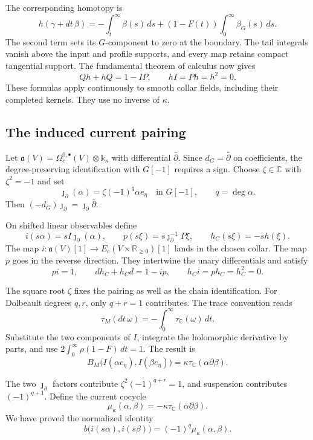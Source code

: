 The corresponding homotopy is
\[
 h(\gamma+dt\,\beta)=-\int_t^\infty\beta(s)\,ds
       +(1-F(t))\int_0^\infty\beta_G(s)\,ds.
\]
The second term sets its \(G\)-component to zero at the boundary.
The tail integrals vanish above the input and profile supports,
and every map retains compact tangential support.
The fundamental theorem of calculus now gives
\[
 Qh+hQ=1-IP,
 \qquad hI=Ph=h^2=0.
\]
These formulas apply continuously to smooth collar fields, including
their completed kernels. They use no inverse of \(\kappa\).

\subsection{The induced current pairing}

Let\label{pcsm:def:current-identification} \(\mathfrak a(V)=\Omega_c^{0,\bullet}(V)\otimes\mathbb k_\kappa\)
with differential \(\bar\partial\).
Since \(d_G=\bar\partial\) on coefficients, the degree-preserving
identification with \(G[-1]\) requires a sign.
Choose \(\zeta\in\mathbb C\) with \(\zeta^2=-1\) and set
\[
 \jmath_\partial(\alpha)=\zeta(-1)^q\alpha e_\eta
       \quad\text{in }G[-1],\qquad q=\deg\alpha.
\]
Then \((-d_G)\jmath_\partial=\jmath_\partial\bar\partial\).

On shifted linear observables define
\begin{equation}\label{pcsm:eq:current-inclusion}
 i(s\alpha)=sI\jmath_\partial(\alpha),\qquad
 p(s\xi)=s\jmath_\partial^{-1}P\xi,\qquad
 h_C(s\xi)=-s h(\xi).
\end{equation}
The map \(i:\mathfrak a(V)[1]\to E_c(V\times\mathbb R_{\geq0})[1]\)
lands in the chosen collar. The map \(p\) goes in the reverse direction.
They intertwine the unary differentials and satisfy
\[
 pi=1,\qquad dh_C+h_Cd=1-ip,\qquad
 h_Ci=ph_C=h_C^2=0.
\]

The square root \(\zeta\) fixes the pairing as well as the chain
identification. For Dolbeault degrees \(q,r\), only \(q+r=1\)
contributes. The trace convention reads
\[
 \tau_M(dt\,\omega)=-\int_0^\infty\tau_{\mathbb C}(\omega)\,dt.
\]
Substitute the two components of \(I\), integrate the holomorphic
derivative by parts, and use
\(2\int_0^\infty\rho(1-F)\,dt=1\).
The result is
\[
 B_M\bigl(I(\alpha e_\eta),I(\beta e_\eta)\bigr)
       =\kappa\tau_{\mathbb C}(\alpha\partial\beta).
\]

The two \(\jmath_\partial\) factors contribute
\(\zeta^2(-1)^{q+r}=1\), and suspension contributes
\((-1)^{q+1}\).
Define the current cocycle
\begin{equation}\label{pcsm:cocycle}
 \mu_\kappa(\alpha,\beta)
       =-\kappa\tau_{\mathbb C}(\alpha\partial\beta).
\end{equation}
We have proved the normalized identity
\begin{equation}\label{pcsm:eq:current-pairing}
 b\bigl(i(s\alpha),i(s\beta)\bigr)
                    =(-1)^q\mu_\kappa(\alpha,\beta).
\end{equation}

